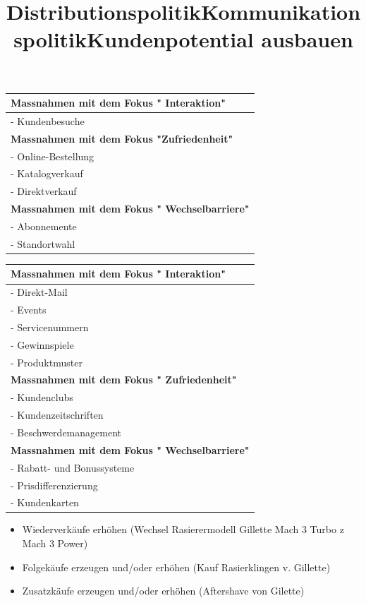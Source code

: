 \documentclass[../ZF_Wing.tex]{subfiles}
\begin{document}
\title{Distributionspolitik}
\begin{table} [H]

\begin{tabular}{l}

\colorbox{pink!30}{\textbf{Massnahmen mit dem Fokus " Interaktion"} }

\\\hline
- Kundenbesuche\\
\hline
\colorbox{pink!30}{\textbf{Massnahmen mit dem Fokus "Zufriedenheit"}}\\
\hline
- Online-Bestellung\\
- Katalogverkauf\\
- Direktverkauf\\
\hline
\colorbox{pink!30}{\textbf{Massnahmen mit dem Fokus " Wechselbarriere"}}\\
\hline
- Abonnemente\\
- Standortwahl
\end{tabular}
\end{table}




\title{Kommunikationspolitik}
\begin{table} [H]

\begin{tabular}{l}

\colorbox{pink!30}{\textbf{Massnahmen mit dem Fokus " Interaktion"} }

\\\hline
- Direkt-Mail\\
- Events\\
- Servicenummern\\
- Gewinnspiele\\
- Produktmuster\\
\hline
\colorbox{pink!30}{\textbf{Massnahmen mit dem Fokus " Zufriedenheit"}}\\
\hline
- Kundenclubs\\
- Kundenzeitschriften\\
- Beschwerdemanagement\\
\hline
\colorbox{pink!30}{\textbf{Massnahmen mit dem Fokus " Wechselbarriere"}}\\
\hline
- Rabatt- und Bonussysteme\\
- Prisdifferenzierung\\
- Kundenkarten\\
\end{tabular}
\end{table}

\title{Kundenpotential ausbauen \\}
\begin{itemize}
	\item Wiederverkäufe erhöhen (Wechsel Rasierermodell Gillette Mach 3 Turbo z Mach 3 Power)
	\item Folgekäufe erzeugen und/oder erhöhen (Kauf Rasierklingen v. Gillette)
	\item Zusatzkäufe erzeugen und/oder erhöhen (Aftershave von Gilette)
\end{itemize}
\end{document}
